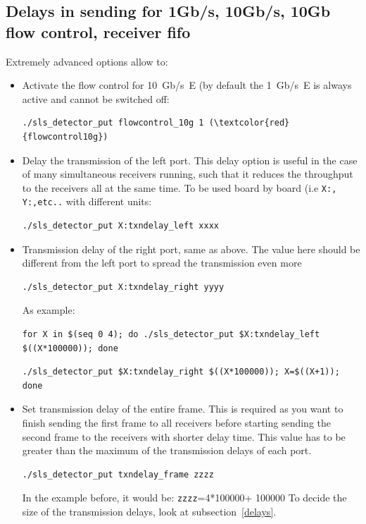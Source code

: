 \documentclass{article}
\begin{document}
{{{\subsection{Delays in sending for 1Gb/s, 10Gb/s, 10Gb flow control, receiver fifo}\label{network}

Extremely advanced options allow to:
\begin{itemize}
\item Activate the flow control for 10~Gb/s~E (by default the 1~Gb/s~E is always active and cannot be switched off:
\begin{verbatim}
./sls_detector_put flowcontrol_10g 1 (\textcolor{red}{flowcontrol10g})
\end{verbatim}
\item  Delay the transmission of the left port. This delay option is useful in the case of many simultaneous receivers running, such that it reduces the throughput to the receivers all at the same time. To be used board by board (i.e {\tt{X:, Y:,etc..}} with different units:
\begin{verbatim}
./sls_detector_put X:txndelay_left xxxx 
\end{verbatim}
\item  Transmission delay of the right port, same as above. The value here should be different from the left port to spread the transmission even more 
\begin{verbatim}
./sls_detector_put X:txndelay_right yyyy
\end{verbatim}
As example:
\begin{verbatim}
for X in $(seq 0 4); do ./sls_detector_put $X:txndelay_left $((X*100000)); done
 \end{verbatim}
\begin{verbatim}
./sls_detector_put $X:txndelay_right $((X*100000)); X=$((X+1)); done
\end{verbatim}

\item Set transmission delay of the entire frame. This is required as you want to finish sending the first frame to all receivers before starting sending the second frame to the receivers with shorter delay time.  This value has to be greater than the maximum of the transmission delays of each port.      
\begin{verbatim}
./sls_detector_put txndelay_frame zzzz
\end{verbatim}
In the example before, it would be: {\tt{zzzz}}=4*100000+ 100000
To decide the size of the transmission delays, look at subsection~\ref{delays}. 


\end{itemize}}}}
\end{document}
